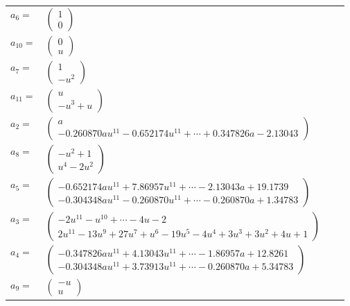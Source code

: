 \documentclass[1p]{elsarticle_modified}
\theoremstyle{definition}
\begin{document}
\begin{tabular}{m{7pt} m{180pt} m{7pt} m{180pt} }
\flushright $a_{6}=$&$\begin{pmatrix}1\\0\end{pmatrix}$ \\
\flushright $a_{10}=$&$\begin{pmatrix}0\\u\end{pmatrix}$ \\
\flushright $a_{7}=$&$\begin{pmatrix}1\\- u^2\end{pmatrix}$ \\
\flushright $a_{11}=$&$\begin{pmatrix}u\\- u^3+u\end{pmatrix}$ \\
\flushright $a_{2}=$&$\begin{pmatrix}a\\-0.260870 a u^{11}-0.652174 u^{11}+\cdots+0.347826 a-2.13043\end{pmatrix}$ \\
\flushright $a_{8}=$&$\begin{pmatrix}- u^2+1\\u^4-2 u^2\end{pmatrix}$ \\
\flushright $a_{5}=$&$\begin{pmatrix}-0.652174 a u^{11}+7.86957 u^{11}+\cdots-2.13043 a+19.1739\\-0.304348 a u^{11}-0.260870 u^{11}+\cdots-0.260870 a+1.34783\end{pmatrix}$ \\
\flushright $a_{3}=$&$\begin{pmatrix}-2 u^{11}- u^{10}+\cdots-4 u-2\\2 u^{11}-13 u^9+27 u^7+u^6-19 u^5-4 u^4+3 u^3+3 u^2+4 u+1\end{pmatrix}$ \\
\flushright $a_{4}=$&$\begin{pmatrix}-0.347826 a u^{11}+4.13043 u^{11}+\cdots-1.86957 a+12.8261\\-0.304348 a u^{11}+3.73913 u^{11}+\cdots-0.260870 a+5.34783\end{pmatrix}$ \\
\flushright $a_{9}=$&$\begin{pmatrix}- u\\u\end{pmatrix}$ \\

\end{tabular}
\end{document}
